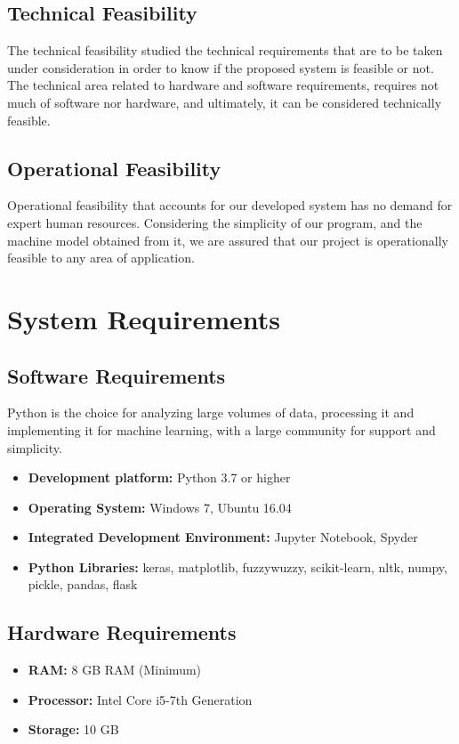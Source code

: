 \subsection{Technical Feasibility}
The technical feasibility studied the technical requirements that are to be taken under consideration in order to know if the proposed system is feasible or not. The technical area related to hardware and software requirements, requires not much of software nor hardware, and ultimately, it can be considered technically feasible.
\par

\subsection{Operational Feasibility}
Operational feasibility that accounts for our developed system has no demand for expert human resources. Considering the simplicity of our program, and the machine model obtained from it, we are assured that our project is operationally feasible to any area of application.


\section{System Requirements}
\subsection{Software Requirements}
Python is the choice for analyzing large volumes of data, processing it and implementing it for machine learning, with a large community for support and simplicity.
\begin{itemize}
\item \textbf{Development platform:} Python 3.7 or higher
\item \textbf{Operating System:} Windows 7, Ubuntu 16.04
\item \textbf{Integrated Development Environment:} Jupyter Notebook, Spyder
\item \textbf{Python Libraries:} keras, matplotlib, fuzzywuzzy, scikit-learn, nltk, numpy, pickle, pandas, flask 
\end{itemize}

\subsection{Hardware Requirements}
\begin{itemize}
	\item \textbf{RAM:} 8 GB RAM (Minimum)
	\item \textbf{Processor:} Intel Core i5-7th Generation
	\item \textbf{Storage:} 10 GB
\end{itemize}


